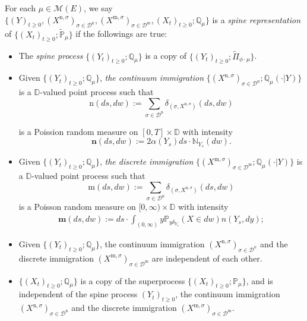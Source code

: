 \documentclass[12pt,a4paper]{amsart}
\theoremstyle{plain}
\theoremstyle{definition}
\numberwithin{equation}{section}
\begin{document}
For each $\mu \in \mathcal M(E)$, we say $\{(Y)_{t\geq 0}, (X^{\mathrm n,
  \sigma})_{\sigma\in \mathcal D^\mathrm n}, (X^{\mathrm m, \sigma})_{\sigma \in
  \mathcal D^\mathrm m}, (X_t)_{t\geq 0}; \mathbb Q_{\mu}\}$ is a \emph{spine
  representation} of $\{(X_t)_{t\geq 0}; \widetilde {\mathbb P}_\mu\}$ if the
followings are true:
\begin{itemize}
\item The \emph{spine process} $\{(Y_t)_{t\geq 0}; \mathbb Q_\mu\}$ is a copy of
  $\{(Y_t)_{t\geq 0}; \widetilde \Pi_{\phi\cdot\mu}\}$.
\item Given $\{(Y_t)_{t\geq 0}; \mathbb Q_\mu\}$, \emph{the continuum
    immigration} $\{ (X^{\mathrm n,\sigma})_{\sigma \in \mathcal D^\mathrm n};
  \mathbb Q_\mu(\cdot |Y)\}$ is a $\mathbb D$-valued point process such that
  \[
	\mathrm n(ds,dw) := \sum_{\sigma\in \mathcal D^{\mathrm n}} \delta_{(\sigma, X^{\mathrm n,\sigma})}(ds,dw)
\]

is a Poission random measure on $[0,T]\times \mathbb D$ with intensity
\[
	\mathbf n(ds,dw):= 2 \alpha(Y_s) ds \cdot \mathbb N_{Y_s}(dw).
\]
\item Given $\{(Y_t)_{t\geq 0}; \mathbb Q_\mu\}$, \emph{the discrete
    immigration} $\{(X^{\mathrm m,\sigma})_{\sigma\in \mathcal D^{\mathrm m}};
  \mathbb Q_\mu(\cdot |Y)\}$ is a $\mathbb D$-valued point process such that
\[
	\mathrm m(ds,dw) := \sum_{\sigma\in \mathcal D^{\mathrm n}} \delta_{(\sigma, X^{\mathrm n,\sigma})}(ds,dw)
\]
is a Poisson random measure on $[0,\infty ) \times \mathbb D$ with intensity
\begin{align}\label{eq:meanMeasImmigr}
	\mathbf m(ds,dw):= ds \cdot \int_{(0,\infty)} y \mathbb P_{y\delta_{Y_s}}(X\in dw) n(Y_s,dy);
\end{align}
\item Given $\{(Y_t)_{t\geq 0}; \mathbb Q_\mu\}$, the continuum immigration
  $(X^{\mathrm n,\sigma})_{\sigma \in \mathcal D^n}$ and the discrete
  immigration $(X^{\mathrm m,\sigma})_{\sigma\in \mathcal D^{\mathrm m}}$ are
  independent of each other.
\item
	$\{(X_t)_{t\geq 0}; \mathbb Q_\mu\}$ is a copy of the superprocess
  $\{(X_t)_{t\geq 0}; \mathbb P_\mu\}$, and is independent of the spine process
  $(Y_t)_{t\geq 0}$, the continuum immigration $(X^{\mathrm n,\sigma})_{\sigma
    \in \mathcal D^\mathrm n}$ and the discrete immigration $(X^{\mathrm
    m,\sigma})_{\sigma\in \mathcal D^{\mathrm m}}$.
\end{itemize}
\end{document}
